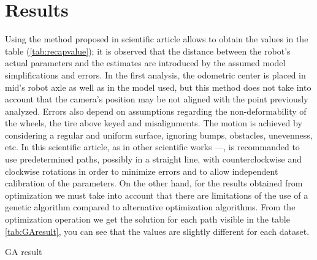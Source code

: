 \section{Results}
Using the method proposed in scientific article \cite{1512356} allows to obtain the values in the table (\ref{tab:recapvalue}); it is observed that the distance between the robot’s actual parameters and the estimates are introduced by the assumed model simplifications and errors.
In the first analysis, the odometric center is placed in mid’s robot axle as well as in the model used, but this method does not take into account that the camera’s position may be not aligned with the point previously analyzed.
Errors also depend on assumptions regarding the non-deformability of the wheels, the tire above keyed and misalignments.
The motion is achieved by considering a regular and uniform surface, ignoring bumps, obstacles, unevenness, etc. 
In this scientific article, as in other scientific works \cite{censi13joint}--\cite{Jung2016}--\cite{DBLP:journals/ijrr/ChongK99}, is recommanded to use predetermined paths, possibly in a straight line, with counterclockwise and clockwise rotations in order to minimize errors and to allow independent calibration of the parameters.
On the other hand, for the results obtained from optimization we must take into account that there are limitations of the use of a genetic algorithm compared to alternative optimization algorithms.
From the optimization operation we get the solution for each path visible in the table \ref{tab:GAresult}, you can see that the values are slightly different for each dataset.
\begin{table}[!h]
\centering
\begin{adjustbox}{max width=0.45\textwidth}
\end{adjustbox}
\caption{GA result}
\label{tab:GAresult}
\end{table}
